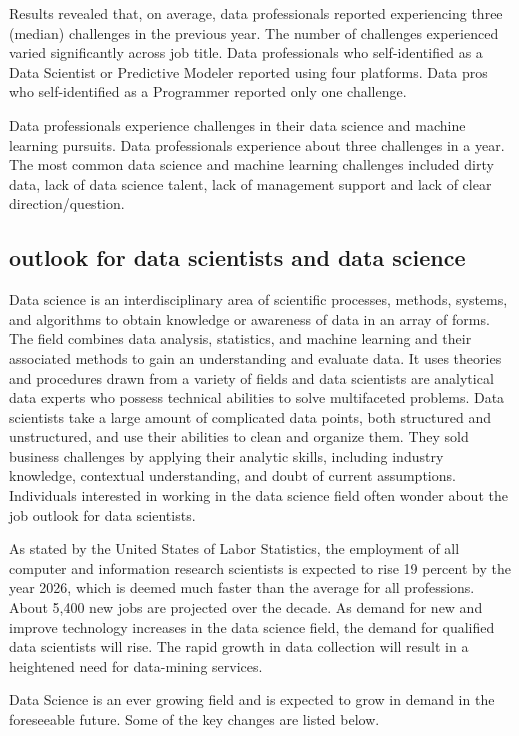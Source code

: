 \documentclass[a4paper, 11pt,twoside=true]{scrartcl}
\begin{document}
\quad Results revealed that, on average, data professionals reported experiencing three (median) challenges in the previous year. The number of challenges experienced varied significantly across job title. Data professionals who self-identified as a Data Scientist or Predictive Modeler reported using four platforms. Data pros who self-identified as a Programmer reported only one challenge.

\quad Data professionals experience challenges in their data science and machine learning pursuits. Data professionals experience about three challenges in a year. The most common data science and machine learning challenges included dirty data, lack of data science talent, lack of management support and lack of clear direction/question.
	
\subsection{outlook for data scientists and data science}
\qquad Data science is an interdisciplinary area of scientific processes, methods, systems, and algorithms to obtain knowledge or awareness of data in an array of forms. The field combines data analysis, statistics, and machine learning and their associated methods to gain an understanding and evaluate data. It uses theories and procedures drawn from a variety of fields and data scientists are analytical data experts who possess technical abilities to solve multifaceted problems. Data scientists take a large amount of complicated data points, both structured and unstructured, and use their abilities to clean and organize them. They sold business challenges by applying their analytic skills, including industry knowledge, contextual understanding, and doubt of current assumptions. Individuals interested in working in the data science field often wonder about the job outlook for data scientists.

\quad As stated by the United States of Labor Statistics, the employment of all computer and information research scientists is expected to rise 19 percent by the year 2026, which is deemed much faster than the average for all professions. About 5,400 new jobs are projected over the decade. As demand for new and improve technology increases in the data science field, the demand for qualified data scientists will rise. The rapid growth in data collection will result in a heightened need for data-mining services.

\quad Data Science is an ever growing field and is expected to grow in demand in the foreseeable future. Some of the key changes are listed below.
\end{document}
